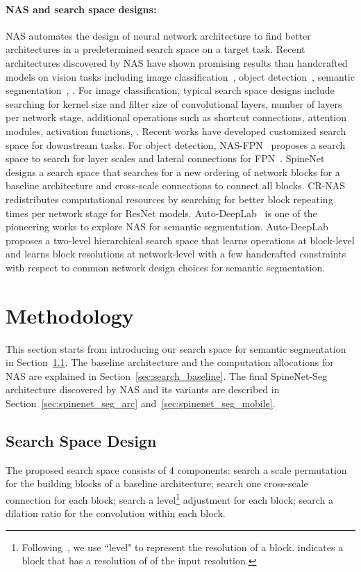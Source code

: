 \documentclass[10pt,twocolumn,letterpaper]{article}
\begin{document}
\paragraph{NAS and search space designs:} NAS automates the design of neural network architecture to find better architectures in a predetermined search space on a target task. Recent architectures discovered by NAS have shown promising results than handcrafted models on vision tasks including image classification~\cite{nasnet,amoebanet,mnasnet,mobilenetv3}, object detection~\cite{nasfpn,spinenet,Du2020EfficientSB,detnet,nasfcos,xu2019autofpn,Liang2020ComputationRF}, semantic segmentation~\cite{autodeeplab,Shaw2019SqueezeNASFN}, \etc. For image classification, typical search space designs include searching for kernel size and filter size of convolutional layers, number of layers per network stage, additional operations such as shortcut connections, attention modules, activation functions, \etc. Recent works have developed customized search space for downstream tasks. For object detection, NAS-FPN~\cite{nasfpn} proposes a search space to search for layer scales and lateral connections for FPN~\cite{fpn}. SpineNet~\cite{spinenet} designs a search space that searches for a new ordering of network blocks for a baseline architecture and cross-scale connections to connect all blocks. CR-NAS~\cite{Liang2020ComputationRF} redistributes computational resources by searching for better block repeating times per network stage for ResNet models. Auto-DeepLab~\cite{autodeeplab} is one of the pioneering works to explore NAS for semantic segmentation. Auto-DeepLab proposes a two-level hierarchical search space that learns operations at block-level and learns block resolutions at network-level with a few handcrafted constraints with respect to common network design choices for semantic segmentation.

\section{Methodology}\label{sec:methodology}
This section starts from introducing our search space for semantic segmentation in Section~\ref{sec:search_space}. The baseline architecture and the computation allocations for NAS are explained in Section~\ref{sec:search_baseline}. The final SpineNet-Seg architecture discovered by NAS and its variants are described in Section~\ref{sec:spinenet_seg_arc} and~\ref{sec:spinenet_seg_mobile}. 

\subsection{Search Space Design}\label{sec:search_space}
The proposed search space consists of 4 components: search a scale permutation for the building blocks of a baseline architecture; search one cross-scale connection for each block; search a level\footnote{Following~\cite{spinenet}, we use ``level" to represent the resolution of a block.  indicates a block that has a resolution of  of the input resolution.} adjustment for each block; search a dilation ratio for the convolution within each block.
\end{document}

